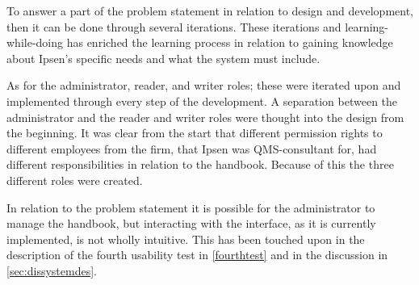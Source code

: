 To answer a part of the problem statement in relation to design and development, then it can be done through several iterations.
These iterations and learning-while-doing has enriched the learning process in relation to gaining knowledge about Ipsen's specific needs and what the system must include.


As for the administrator, reader, and writer roles; these were iterated upon and implemented through every step of the development.
A separation between the administrator and the reader and writer roles were thought into the design from the beginning.
It was clear from the start that different permission rights to different employees from the firm, that Ipsen was QMS-consultant for, had different responsibilities in relation to the handbook.
Because of this the three different roles were created.

In relation to the problem statement it is possible for the administrator to manage the handbook, but interacting with the interface, as it is currently implemented, is not wholly intuitive.
This has been touched upon in the description of the fourth usability test in \cref{fourthtest} and in the discussion in \cref{sec:dissystemdes}.

%
